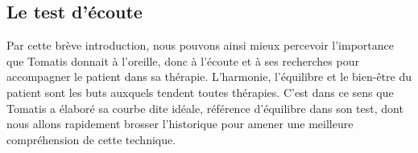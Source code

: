 
\subsection{Le test d'écoute}
Par cette brève introduction, nous pouvons ainsi mieux percevoir l'importance que Tomatis donnait à l'oreille, donc à l'écoute et à ses recherches pour accompagner le patient dans sa thérapie.
L'harmonie, l'équilibre et le bien-être du patient sont les buts auxquels tendent  toutes thérapies. C'est 
dans ce sens que Tomatis a élaboré sa courbe dite idéale, référence d'équilibre dans son test, dont nous 
allons rapidement brosser l'historique pour amener une meilleure compréhension de cette technique.

